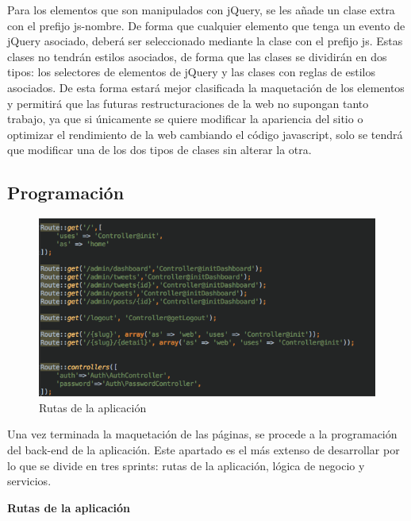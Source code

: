 \vspace{5 mm}

Para los elementos que son manipulados con jQuery, se les añade un clase extra con el prefijo js-nombre. De forma que cualquier elemento que tenga un evento de jQuery asociado, deberá ser seleccionado mediante la clase con el prefijo js. Estas clases no tendrán estilos asociados, de forma que las clases se dividirán en dos tipos: los selectores de elementos de jQuery y las clases con reglas de estilos asociados. De esta forma estará mejor clasificada la maquetación de los elementos y permitirá que las futuras restructuraciones de la web no supongan tanto trabajo, ya que si únicamente se quiere modificar la apariencia del sitio o optimizar el rendimiento de la web cambiando el código javascript, solo se tendrá que modificar una de los dos tipos de clases sin alterar la otra.


\subsection{Programación}

\begin{figure}
\begin{center}
\includegraphics[width=1.0\textwidth]{imagenes/routes.png}
\caption{Rutas de la aplicación}
\label{rutas-app}
\end{center}
\end{figure}


Una vez terminada la maquetación de las páginas, se procede a la programación del back-end de la aplicación. Este apartado es el más extenso de desarrollar por lo que se divide en tres sprints: rutas de la aplicación, lógica de negocio y servicios.

\vspace{5 mm}


\textbf{Rutas de la aplicación}

